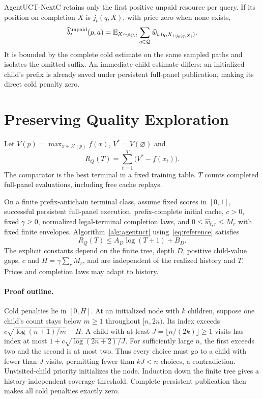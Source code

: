AgentUCT-NextC retains only the first positive unpaid resource per query.
If its position on completion $X$ is $j_t(q,X)$, with price zero when none exists,
\begin{equation}
\widehat b_t^{\mathrm{unpaid}}(p,a)=
\mathbb{E}_{X\sim\rho_{C,t}}\sum_{q\in\mathcal Q}
\widehat w_{t,(q,X_{1:j_t(q,X)})}.
\label{eq:next-unpaid}
\end{equation}
It is bounded by the complete cold estimate on the same sampled paths and
isolates the omitted suffix. An immediate-child estimate differs: an
initialized child's prefix is already saved under persistent full-panel
publication, making its direct cold penalty zero.




\section{Preserving Quality Exploration}
\label{sec:theory}
Let $V(p)=\max_{x\in\mathcal X(p)}f(x)$, $V^*=V(\varnothing)$ and
\begin{equation}
R_Q(T)=\sum_{t=1}^T\bigl(V^*-f(x_t)\bigr).
\label{eq:qualityregret}
\end{equation}
The comparator is the best terminal in a fixed training table. $T$ counts
completed full-panel evaluations, including free cache replays.

\begin{theorem}
\label{thm:main}
On a finite prefix-antichain terminal class, assume fixed scores in $[0,1]$,
successful persistent full-panel execution, prefix-complete initial cache,
$c>0$, fixed $\gamma\ge0$, normalized legal-terminal completion laws, and
$0\le\widehat w_{t,r}\le M_r$ with fixed finite envelopes. Algorithm~\ref{alg:agentuct}
using~\eqref{eq:reference} satisfies
\begin{equation}
R_Q(T)\le A_D\log(T+1)+B_D.
\label{eq:mainbound}
\end{equation}
The explicit constants depend on the finite tree, depth $D$, positive
child-value gaps, $c$ and $H=\gamma\sum_rM_r$, and are independent of the
realized history and $T$. Prices and completion laws may adapt to history.
\end{theorem}

\paragraph{Proof outline.}
Cold penalties lie in $[0,H]$. At an initialized node with $k$ children,
suppose one child's count stays below $m\ge1$ throughout $[n,2n)$.
Its index exceeds $c\sqrt{\log(n+1)/m}-H$. A child with at least
$J=\lfloor n/(2k)\rfloor\ge1$ visits has index at most
$1+c\sqrt{\log(2n+2)/J}$. For sufficiently large $n$, the first exceeds
two and the second is at most two. Thus every choice must go to a child
with fewer than $J$ visits, permitting fewer than $kJ<n$ choices, a
contradiction. Unvisited-child priority initializes the node. Induction
down the finite tree gives a history-independent coverage threshold.
Complete persistent publication then makes all cold penalties exactly zero.

